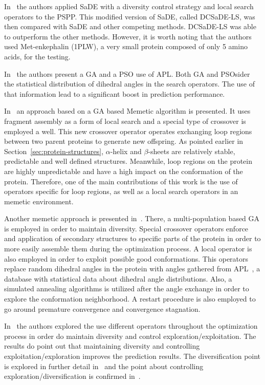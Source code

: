 In~\cite{sudha2015protein} the authors applied \ac{SaDE} with a diversity control
strategy and local search operators to the PSPP. This modified version of
\ac{SaDE}, called DCSaDE-LS, was then compared with \ac{SaDE} and other
competing methods. DCSaDE-LS was able to outperform the other methods. However,
it is worth noting that the authors used Met-enkephalin (1PLW), a very small
protein composed of only 5 amino acids, for the testing.

In~\cite{borguesan2015apl} the authors present a \ac{GA} and a \ac{PSO} use
of \ac{APL}. Both \ac{GA} and \ac{PSO}sider the statistical distribution of
dihedral angles in the search operators. The use of that information lead to a
significant boost in prediction performance.

In~\cite{garza2016generating} an approach based on a GA based Memetic algorithm
is presented. It uses fragment assembly as a form of local search and a special
type of crossover is employed a well. This new crossover operator operates
exchanging loop regions between two parent proteins to generate new offspring.
As pointed earlier in Section~\ref{sec:protein-structures}, $\alpha$-helix and
$\beta$-sheets are relatively stable, predictable and well defined structures.
Meanwhile, loop regions on the protein are highly unpredictable and have a high
impact on the conformation of the protein. Therefore, one of the main
contributions of this work is the use of operators specific for loop regions,
as well as a local search operators in an memetic environment.

Another memetic approach is presented in~\cite{correa2016memetic}. There, a multi-population
based \ac{GA} is employed in order to maintain diversity. Special crossover operators enforce
and application of secondary structures to specific parts of the protein in order
to more easily assemble them during the optimization process. A local operator is
also employed in order to exploit possible good conformations. This operators
replace random dihedral angles in the protein with angles gathered from
\ac{APL}~\cite{borguesan2015apl}, a database with statistical data about dihedral angle
distributions. Also, a simulated annealing algorithms is utilized after the angle
exchange in order to explore the conformation neighborhood. A restart procedure is also
employed to go around premature convergence and convergence stagnation.

In~\cite{narloch2017protein} the authors explored the use different operators
throughout the optimization process in order do maintain diversity and control
exploration/exploitation. The results do point out that maintaining diversity
and controlling exploitation/exploration improves the prediction results.
The diversification point is explored in further detail in~\cite{narloch2016diversification}
and the point about controlling exploration/diversification is confirmed
in~\cite{simoncini2017balancing}.

